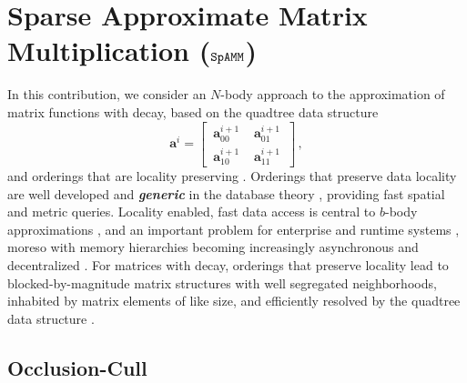 \documentclass[letterpaper,twocolumn,amsmath,amsfont,amssymb,english,aps,jcp,preprintnumbers,groupaddress,nofootinbib,tightenlines,floatfix]{revtex4}
\newcommand{\mat}[1]{\boldsymbol{#1}}
\theoremstyle{plain}
\theoremstyle{remark}
\theoremstyle{plain}
\begin{document}
\tableofcontents

\section{Sparse Approximate Matrix Multiplication ($\tt SpAMM$)}

In this contribution, we consider an $N$-body approach to the
approximation of matrix functions with decay, based on the quadtree data structure \cite{wise, samet}
\begin{equation}
\mat{a}^i = \begin{bmatrix} \,  \mat{a}^{i+1}_{00} \, & \,  \mat{a}^{i+1}_{01} \,  \\[0.2cm]  \, \mat{a}^{i+1}_{10} \,  & \,\mat{a}^{i+1}_{11} \, \end{bmatrix} \, ,
\end{equation}
and orderings that are locality preserving \cite{}.  Orderings that
preserve data locality are well developed and {\bf \em generic} in the database theory
\cite{}, providing fast spatial and metric queries.  Locality
enabled, fast data access is central to  $b$-body approximations
\cite{}, and an important problem for enterprise \cite{} and runtime
systems \cite{}, moreso with memory hierarchies becoming increasingly
asynchronous and decentralized \cite{cache}.  For matrices with
decay, orderings that preserve locality lead to blocked-by-magnitude
matrix structures with well segregated neighborhoods, inhabited by
matrix elements of like size, and efficiently resolved by the quadtree
data structure \cite{}.

\subsection{Occlusion-Cull }
\end{document}

